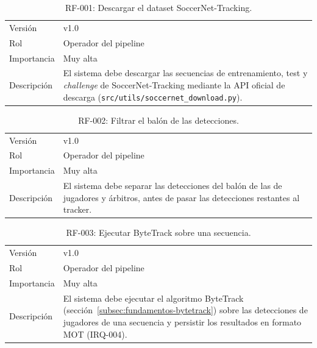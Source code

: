 \begin{table}[htp]
\centering
\caption{RF-001: Descargar el dataset SoccerNet-Tracking.}
\label{tab:rf-001}
\renewcommand{\arraystretch}{1.2}
\begin{tabular}{|p{3.1cm}|p{9.2cm}|}
\hline
\rowcolor{gray!25}
\multicolumn{2}{|l|}{\textbf{RF-001 -- Descargar el dataset SoccerNet-Tracking}} \\
\hline
Versión & v1.0 \\
\hline
Rol & Operador del pipeline \\
\hline
Importancia & Muy alta \\
\hline
Descripción & El sistema debe descargar las secuencias de entrenamiento,
  test y \emph{challenge} de SoccerNet-Tracking mediante la API oficial de
  descarga (\texttt{src/utils/soccernet\_download.py}). \\
\hline
\end{tabular}
\end{table}

\begin{table}[htp]
\centering
\caption{RF-002: Filtrar el balón de las detecciones.}
\label{tab:rf-002}
\renewcommand{\arraystretch}{1.2}
\begin{tabular}{|p{3.1cm}|p{9.2cm}|}
\hline
\rowcolor{gray!25}
\multicolumn{2}{|l|}{\textbf{RF-002 -- Filtrar el balón de las detecciones}} \\
\hline
Versión & v1.0 \\
\hline
Rol & Operador del pipeline \\
\hline
Importancia & Muy alta \\
\hline
Descripción & El sistema debe separar las detecciones del balón de las de
  jugadores y árbitros, antes de pasar las detecciones
  restantes al tracker. \\
\hline
\end{tabular}
\end{table}

\begin{table}[htp]
\centering
\caption{RF-003: Ejecutar ByteTrack sobre una secuencia.}
\label{tab:rf-003}
\renewcommand{\arraystretch}{1.2}
\begin{tabular}{|p{3.1cm}|p{9.2cm}|}
\hline
\rowcolor{gray!25}
\multicolumn{2}{|l|}{\textbf{RF-003 -- Ejecutar ByteTrack sobre una secuencia}} \\
\hline
Versión & v1.0 \\
\hline
Rol & Operador del pipeline \\
\hline
Importancia & Muy alta \\
\hline
Descripción & El sistema debe ejecutar el algoritmo ByteTrack
  (sección~\ref{subsec:fundamentos-bytetrack}) sobre las detecciones de
  jugadores de una secuencia y persistir los resultados en formato MOT
  (IRQ-004). \\
\hline
\end{tabular}
\end{table}

